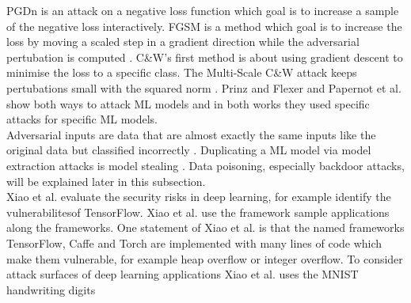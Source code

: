 PGDn is an attack on a negative loss function \cite{DBLP:journals/corr/MadryMSTV17} which goal is to increase a sample of the negative loss interactively. FGSM is a method which goal is to increase the loss by moving a scaled step in a gradient direction while the adversarial pertubation is computed \cite{DBLP:journals/corr/GoodfellowSS14}. C\&W's first method is about using gradient descent to minimise the loss to a specific class. The Multi-Scale C\&W attack keeps pertubations small with the squared norm \cite{DBLP:conf/sp/Carlini018}.
Prinz and Flexer \cite{DBLP:journals/corr/abs-2007-14714} and Papernot et al. \cite{DBLP:conf/ccs/PapernotMGJCS17} show both ways to attack ML models and in both works they used specific attacks for specific ML models. \\
Adversarial inputs are data that are almost exactly the same inputs like the original data but classified incorrectly \cite{DBLP:conf/iclr/MadryMSTV18}. Duplicating a ML model via model extraction attacks is model stealing \cite{DBLP:conf/acsac/Hu021}. Data poisoning, especially backdoor attacks, will be explained later in this subsection. \\
Xiao et al. \cite{DBLP:conf/sp/XiaoLZX18} evaluate the security risks in deep learning, for example identify the vulnerabilitesof TensorFlow. Xiao et al. use the framework sample applications along the frameworks. One statement of Xiao et al. is that the named frameworks TensorFlow, Caffe and Torch are implemented with many lines of code which make them vulnerable, for example heap overflow or integer overflow. To consider attack surfaces of deep learning applications Xiao et al. uses the MNIST handwriting digits
